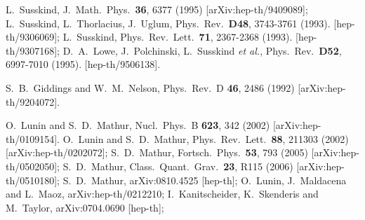 \documentclass[11pt]{article}
\begin{document}
\begin{thebibliography}{10}
  L.~Susskind,
  J.\ Math.\ Phys.\  {\bf 36}, 6377 (1995)
  [arXiv:hep-th/9409089];
  L.~Susskind, L.~Thorlacius, J.~Uglum,
  Phys.\ Rev.\  {\bf D48}, 3743-3761 (1993).
  [hep-th/9306069];
  L.~Susskind,
  Phys.\ Rev.\ Lett.\  {\bf 71}, 2367-2368 (1993).
  [hep-th/9307168];
  D.~A.~Lowe, J.~Polchinski, L.~Susskind {\it et al.},
  Phys.\ Rev.\  {\bf D52}, 6997-7010 (1995).
  [hep-th/9506138].


  
  
  S.~B.~Giddings and W.~M.~Nelson,
  Phys.\ Rev.\  D {\bf 46}, 2486 (1992)
  [arXiv:hep-th/9204072].





O.~Lunin and S.~D.~Mathur,
  Nucl.\ Phys.\  B {\bf 623}, 342 (2002)
  [arXiv:hep-th/0109154].
O.~Lunin and S.~D.~Mathur,
  Phys.\ Rev.\ Lett.\  {\bf 88}, 211303 (2002)
  [arXiv:hep-th/0202072];
  S.~D.~Mathur,
  Fortsch.\ Phys.\  {\bf 53}, 793 (2005)
  [arXiv:hep-th/0502050];
  S.~D.~Mathur,
  Class.\ Quant.\ Grav.\  {\bf 23}, R115 (2006)
  [arXiv:hep-th/0510180];
  S.~D.~Mathur,
  arXiv:0810.4525 [hep-th];
  O.~Lunin, J.~Maldacena and L.~Maoz,
arXiv:hep-th/0212210;
%
I.~Kanitscheider, K.~Skenderis and M.~Taylor,
  arXiv:0704.0690 [hep-th];



\end{thebibliography}
\end{document}

